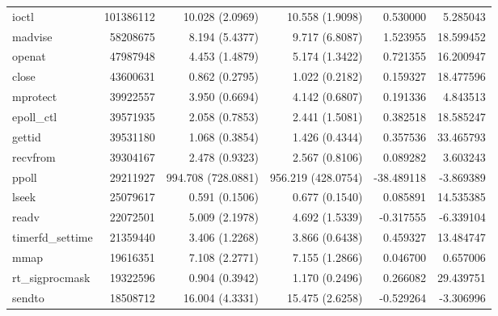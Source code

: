\begin{longtable}{>{\ttfamily}lrrrrr}
                          ioctl &   101386112 &          10.028 (2.0969) &          10.558 (1.9098) &        0.530000 &     5.285043 \\
                        madvise &    58208675 &           8.194 (5.4377) &           9.717 (6.8087) &        1.523955 &    18.599452 \\
                         openat &    47987948 &           4.453 (1.4879) &           5.174 (1.3422) &        0.721355 &    16.200947 \\
                          close &    43600631 &           0.862 (0.2795) &           1.022 (0.2182) &        0.159327 &    18.477596 \\
                       mprotect &    39922557 &           3.950 (0.6694) &           4.142 (0.6807) &        0.191336 &     4.843513 \\
                     epoll\_ctl &    39571935 &           2.058 (0.7853) &           2.441 (1.5081) &        0.382518 &    18.585247 \\
                         gettid &    39531180 &           1.068 (0.3854) &           1.426 (0.4344) &        0.357536 &    33.465793 \\
                       recvfrom &    39304167 &           2.478 (0.9323) &           2.567 (0.8106) &        0.089282 &     3.603243 \\
                          ppoll &    29211927 &       994.708 (728.0881) &       956.219 (428.0754) &      -38.489118 &    -3.869389 \\
                          lseek &    25079617 &           0.591 (0.1506) &           0.677 (0.1540) &        0.085891 &    14.535385 \\
                          readv &    22072501 &           5.009 (2.1978) &           4.692 (1.5339) &       -0.317555 &    -6.339104 \\
               timerfd\_settime &    21359440 &           3.406 (1.2268) &           3.866 (0.6438) &        0.459327 &    13.484747 \\
                           mmap &    19616351 &           7.108 (2.2771) &           7.155 (1.2866) &        0.046700 &     0.657006 \\
                rt\_sigprocmask &    19322596 &           0.904 (0.3942) &           1.170 (0.2496) &        0.266082 &    29.439751 \\
                         sendto &    18508712 &          16.004 (4.3331) &          15.475 (2.6258) &       -0.529264 &    -3.306996 \\

\end{longtable}
